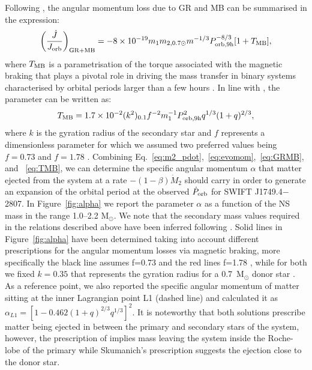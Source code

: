 \documentclass[fleqn,usenatbib]{mnras}
\newcommand{\swiftj}{SWIFT J1749.4$-$2807}
\begin{document}
Following \citet{Burderi:2010tk}, the angular momentum loss due to GR and MB can be summarised in the expression:
\begin{equation} 
\label{eq:GRMB}
\left(\frac{\dot{J}}{J_{\rm orb}}\right)_{\rm GR+MB}=-8\times 10^{-19}m_1 m_{2,0.7\odot}m^{-1/3}P_{\rm orb,9h}^{-8/3}[1+T_{\rm MB}],
\end{equation}
where $T_{\rm MB}$ is a parametrisation of the torque associated with the magnetic braking that plays a pivotal role in driving the mass transfer in binary systems characterised by orbital periods larger than a few hours \citep{Verbunt:1993vj}. In line with \citet[][]{Iaria:2018tq}, the parameter can be written as:
\begin{equation}
\label{eq:TMB}	
T_{\rm MB}=1.7\times 10^{-2}(k^2)_{0.1}f^{-2}m_1^{-1}P_{\rm orb,9h}^2q^{1/3}(1+q)^{2/3},
\end{equation}
where $k$ is the gyration radius of the secondary star and $f$ represents a dimensionless parameter for which we assumed two preferred values being $f=0.73$ \citep{Skumanich:1972vy} and $f=1.78$ \citep{Smith:1979vn}.
Combining Eq.~\ref{eq:m2_pdot},~\ref{eq:evomom},~\ref{eq:GRMB}, and ~\ref{eq:TMB}, we can determine the specific angular momentum $\alpha$ that matter ejected from the system at a rate $-(1-\beta)\dot{M}_2$ should carry in order to generate an expansion of the orbital period at the observed $\dot{P}_{\rm orb}$ for \swiftj{}. In Figure~\ref{fig:alpha} we report the parameter $\alpha$ as a function of the NS mass in the range 1.0--2.2 M$_\odot$. We note that the secondary mass values required in the relations described above have been inferred following \citet{Markwardt:2010tl}. Solid lines in Figure~\ref{fig:alpha} have been determined taking into account different prescriptions for the angular momentum losses via magnetic braking, more specifically the black line assumes f=0.73 \citep{Skumanich:1972vy} and the red lines f=1.78 \citep{Smith:1979vn}, while for both we fixed $k=0.35$ that represents the gyration radius for a 0.7~M$_\odot$ donor star \citep[see e.g.,][]{Claret:1990to}. As a reference point, we also reported the specific angular momentum of matter sitting at the inner Lagrangian point L1 (dashed line) and calculated it as $\alpha_{L1}=[1 -0.462(1 + q)^{2/3}q^{1/3}]^2$. It is noteworthy that both solutions prescribe matter being ejected in between the primary and secondary stars of the system, however, the prescription of \citet{Smith:1979vn} implies mass leaving the system inside the Roche-lobe of the primary while Skumanich's prescription suggests the ejection close to the donor star. 
\end{document}
